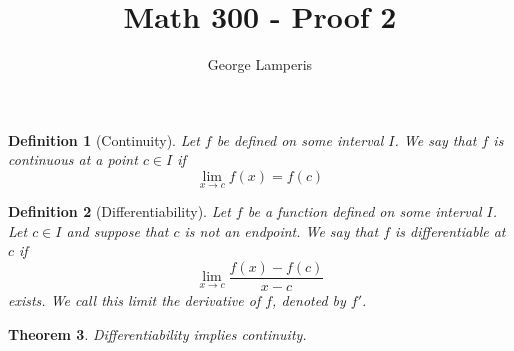 \documentclass[12pt]{article}
\title{Math 300 - Proof 2}
\author{George Lamperis}
\date{}
\theoremstyle{mystyle}
\newtheorem{thm}{Theorem}
\newtheorem{defn}[thm]{Definition}
\begin{document}
\maketitle

\begin{defn}[Continuity]
  Let $f$ be defined on some interval $I$. We say that $f$ is continuous at a
  point $c \in I$ if $$\lim_{x \to c} f(x) = f(c)$$ 
\end{defn}


\begin{defn}[Differentiability]
  Let $f$ be a function defined on some interval $I$. Let $c \in I$ and
  suppose that $c$ is not an endpoint. We say that $f$ is differentiable at $c$
  if 
  $$ \lim_{x \to c} \frac{f(x)-f(c)}{x-c}$$
  exists. We call this limit the derivative of $f$, denoted by $f'$.
\end{defn}


\begin{thm}
  Differentiability implies continuity.
\end{thm}
\end{document}
